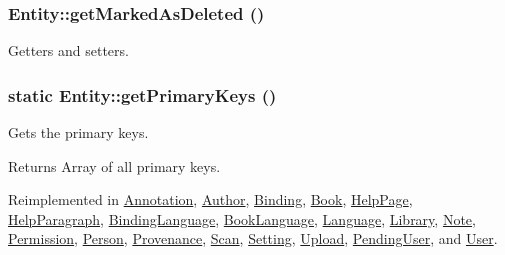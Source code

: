 \hypertarget{classEntity_abe1d992f6f319c4c2812163a8d2d1f66}{
\subsubsection[{getMarkedAsDeleted}]{\setlength{\rightskip}{0pt plus 5cm}Entity::getMarkedAsDeleted ()}}
\label{classEntity_abe1d992f6f319c4c2812163a8d2d1f66}
Getters and setters. \hypertarget{classEntity_a61bbfbb4058427174e002a09ddc77c41}{
\subsubsection[{getPrimaryKeys}]{\setlength{\rightskip}{0pt plus 5cm}static Entity::getPrimaryKeys ()}}
\label{classEntity_a61bbfbb4058427174e002a09ddc77c41}
Gets the primary keys.

\begin{DoxyReturn}{Returns}
Array of all primary keys. 
\end{DoxyReturn}


Reimplemented in \hyperlink{classAnnotation_a8676c5ad1cf917a17cc70bb8c816437c}{Annotation}, \hyperlink{classAuthor_abeb5bf2d5739d0e46522c608c04db776}{Author}, \hyperlink{classBinding_ac7539d5770936644b98be102ed66a4e5}{Binding}, \hyperlink{classBook_ae2a08ea5916ed402169f59b6ad853d13}{Book}, \hyperlink{classHelpPage_aad190998d886f0c38ecbb056f32c2b96}{HelpPage}, \hyperlink{classHelpParagraph_af092a2b620b5efda2dd5f6dc695b9295}{HelpParagraph}, \hyperlink{classBindingLanguage_aafc27da4c3edcd204cf51d2d2429e8eb}{BindingLanguage}, \hyperlink{classBookLanguage_a2efcb1546e54019661200ad14276c5b6}{BookLanguage}, \hyperlink{classLanguage_ad85ca28f29f19ec96d0151d21a2485a6}{Language}, \hyperlink{classLibrary_a026a18e3d13f83be2ee85221156f7864}{Library}, \hyperlink{classNote_a72d5489c580726d4fbb55359ae98db5a}{Note}, \hyperlink{classPermission_a378dfdccb2df0e6d2b7bb059cd918873}{Permission}, \hyperlink{classPerson_a127a92657a50a2a51c8892dd625af9ee}{Person}, \hyperlink{classProvenance_ad45c3e72c9462e73123e310a49da9154}{Provenance}, \hyperlink{classScan_a0e7fe3c9a64e4655114a82473fc78827}{Scan}, \hyperlink{classSetting_a20ab54f018e4987326d20a5464c7e615}{Setting}, \hyperlink{classUpload_af0e0a173941a75ed21e7d51d86c7d0c4}{Upload}, \hyperlink{classPendingUser_a305b86bf62019e4ca80b769ea75644cf}{PendingUser}, and \hyperlink{classUser_a14fab2319493a4940e1975b72386e80a}{User}.

